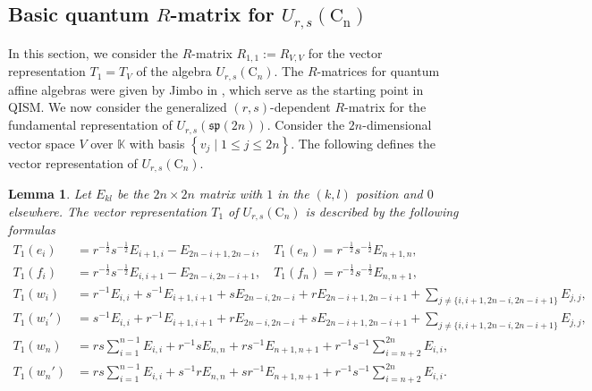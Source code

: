 \documentclass[10pt,a4paper]{amsart}
\newtheorem{lemma}[theorem]{Lemma}
\numberwithin{equation}{section}
\begin{document}
	\subsection{Basic quantum $R$-matrix for $U_{r, s}\left(\mathrm{C_n}\right)$}
In this section, we consider the $R$-matrix $R_{1,1}:=R_{V, V}$ for the vector representation $T_1=T_V$ of the algebra $U_{r, s}\left(\mathrm{C}_n\right)$.
The $R$-matrices for quantum affine algebras were given by Jimbo in \cite{J}, which serve as the starting point in QISM.
We now consider the generalized $(r, s)$-dependent $R$-matrix for the fundamental representation of $U_{r, s}(\mathfrak{sp}(2n))$.
Consider the $2n$-dimensional vector space $V$ over $\mathbb{K}$ with basis $\left\{v_j \mid 1 \leq j \leq 2 n\right\}$. The following defines
the vector representation of $U_{r, s}\left(\mathrm{C}_n\right)$.
	\begin{lemma}
		Let $E_{k l}$ be the $2 n \times 2 n$ matrix with $1$ in the $(k, l)$ position and $0$
		elsewhere. The vector representation $T_1$ of $U_{r, s}\left(\mathrm{C}_n\right)$  is described by the following formulas
\begin{align*}
	T_1\left(e_i\right)&=r^{-\frac{1}{2}} s^{-\frac{1}{2}} E_{i+1, i}-E_{2 n-i+1,2 n-i}, \quad T_1\left(e_n\right)=r^{-\frac{1}{2}} s^{-\frac{1}{2}} E_{n+1, n}, \\
	T_1\left(f_i\right)&=r^{-\frac{1}{2}} s^{-\frac{1}{2}} E_{i, i+1}-E_{2 n-i, 2 n-i+1}, \quad T_1\left(f_n\right)=r^{-\frac{1}{2}} s^{-\frac{1}{2}} E_{n, n+1}, \\
	T_1\left(w_i\right)&=r^{-1} E_{i, i}+s^{-1} E_{i+1, i+1}+s E_{2 n-i, 2 n-i}+r E_{2 n-i+1,2 n-i+1}+\sum_{j \neq\{i, i+1,2 n-i, 2 n-i+1\}} E_{j, j}, \\
	T_1\left(w_i'\right)&=s^{-1} E_{i, i}+r^{-1} E_{i+1, i+1}+r E_{2 n-i, 2 n-i}+s E_{2 n-i+1,2 n-i+1}+\sum_{j \neq\{i, i+1,2 n-i, 2 n-i+1\}} E_{j, j},\\
T_1\left(w_n\right)&=r s \sum_{i=1}^{n-1} E_{i, i}+r^{-1} s E_{n, n}+r s^{-1} E_{n+1, n+1}+r^{-1} s^{-1} \sum_{i=n+2}^{2 n} E_{i, i}, \\
	T_1\left(w_n'\right)&=r s \sum_{i=1}^{n-1} E_{i, i}+s^{-1} r E_{n, n}+s r^{-1} E_{n+1, n+1}+r^{-1} s^{-1} \sum_{i=n+2}^{2 n} E_{i, i} .
\end{align*}
\end{lemma}
\end{document}
